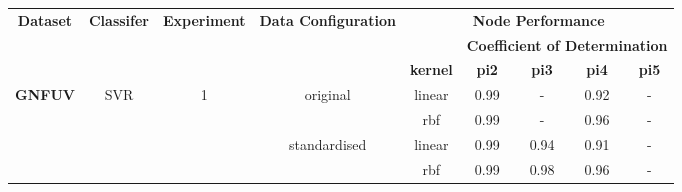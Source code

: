 \documentclass{mpaper}
\begin{document}
\begin{table}[]
\centering
\begin{tabular}{|cccc|ccccc|}
\hline
\multicolumn{1}{|c|}{\multirow{3}{*}{\textbf{Dataset}}} & \multicolumn{1}{c|}{\multirow{3}{*}{\textbf{Classifer}}} & \multicolumn{1}{c|}{\multirow{3}{*}{\textbf{Experiment}}} & \multirow{3}{*}{\textbf{Data Configuration}} & \multicolumn{5}{c|}{\textbf{Node Performance}}                                                    \\ \cline{5-9} 
\multicolumn{1}{|c|}{}                                  & \multicolumn{1}{c|}{}                                    & \multicolumn{1}{c|}{}                                     &                                              & \multicolumn{1}{c|}{}                & \multicolumn{4}{c|}{\textbf{Coefficient of Determination}} \\ \cline{5-9} 
\multicolumn{1}{|c|}{}                                  & \multicolumn{1}{c|}{}                                    & \multicolumn{1}{c|}{}                                     &                                              & \multicolumn{1}{c|}{\textbf{kernel}} & \textbf{pi2}  & \textbf{pi3} & \textbf{pi4} & \textbf{pi5} \\ \hline
\multicolumn{1}{|c|}{\multirow{12}{*}{\textbf{GNFUV}}}  & \multicolumn{1}{c|}{\multirow{12}{*}{SVR}}               & \multicolumn{1}{c|}{\multirow{4}{*}{1}}                   & \multirow{2}{*}{original}                    & \multicolumn{1}{c|}{linear}          & 0.99          & -            & 0.92         & -            \\
\multicolumn{1}{|c|}{}                                  & \multicolumn{1}{c|}{}                                    & \multicolumn{1}{c|}{}                                     &                                              & \multicolumn{1}{c|}{rbf}             & 0.99          & -            & 0.96         & -            \\ \cline{4-9} 
\multicolumn{1}{|c|}{}                                  & \multicolumn{1}{c|}{}                                    & \multicolumn{1}{c|}{}                                     & \multirow{2}{*}{standardised}                & \multicolumn{1}{c|}{linear}          & 0.99          & 0.94         & 0.91         & -            \\
\multicolumn{1}{|c|}{}                                  & \multicolumn{1}{c|}{}                                    & \multicolumn{1}{c|}{}                                     &                                              & \multicolumn{1}{c|}{rbf}             & 0.99          & 0.98         & 0.96         & -            \\ \cline{3-9} 

\end{tabular}
\end{table}
\end{document}
